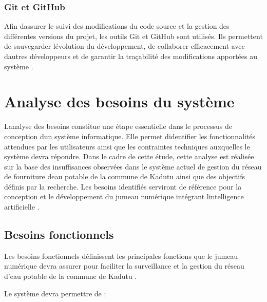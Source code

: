 \subsubsection{Git et GitHub}\label{h-git-et-github}

Afin d\textquotesingle assurer le suivi des modifications du code source
et la gestion des différentes versions du projet, les outils Git et
GitHub sont utilisés. Ils permettent de sauvegarder
l\textquotesingle évolution du développement, de collaborer efficacement
avec d\textquotesingle autres développeurs et de garantir la traçabilité
des modifications apportées au système \cite{ref122}.

\section{Analyse des besoins du système}\label{analyse-des-besoins-du-systuxe8me}

L\textquotesingle analyse des besoins constitue une étape essentielle
dans le processus de conception d\textquotesingle un système
informatique. Elle permet d\textquotesingle identifier les
fonctionnalités attendues par les utilisateurs ainsi que les contraintes
techniques auxquelles le système devra répondre. Dans le cadre de cette
étude, cette analyse est réalisée sur la base des insuffisances
observées dans le système actuel de gestion du réseau de fourniture
d\textquotesingle eau potable de la commune de Kadutu ainsi que des
objectifs définis par la recherche. Les besoins identifiés serviront de
référence pour la conception et le développement du jumeau numérique
intégrant l\textquotesingle intelligence artificielle \cite{ref106}.

\subsection{Besoins fonctionnels}\label{besoins-fonctionnels}

Les besoins fonctionnels définissent les principales fonctions que le
jumeau numérique devra assurer pour faciliter la surveillance et la
gestion du réseau d'eau potable de la commune de Kadutu \cite{ref114}.

Le système devra permettre de :

